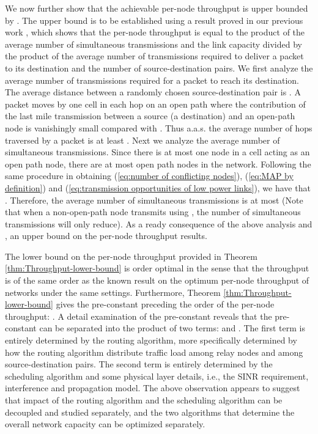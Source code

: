 \documentclass[english]{IEEEtran}
\theoremstyle{plain}
\theoremstyle{plain}
\theoremstyle{plain}
\theoremstyle{remark}
\begin{document}
\begin{IEEEproof}
We now further  show that the achievable per-node throughput is upper
bounded by .
The upper bound is to be established using a result proved in our
previous work \cite[Corollary 6]{Mao13Towards}, which shows that
the per-node throughput is equal to the product of the average number
of simultaneous transmissions and the link capacity divided by the
product of the average number of transmissions required to deliver
a packet to its destination and the number of source-destination pairs.
We first analyze the average number of transmissions required for
a packet to reach its destination. The average distance between a
randomly chosen source-destination pair is  \cite{Philip07The}.
A packet moves by one cell in each hop on an open path where the contribution
of the last mile transmission between a source (a destination) and
an open-path node is vanishingly small compared with .
Thus a.a.s. the average number of hops traversed by a packet is at
least . Next we analyze the average number
of simultaneous transmissions. Since there is at most one node in
a cell acting as an open path node, there are at most 
open path nodes in the network. Following the same procedure in obtaining
(\ref{eq:number of conflicting nodes}), (\ref{eq:MAP by definition})
and (\ref{eq:transmission opportunities of low power links}), we
have that .
Therefore, the average number of simultaneous transmissions is at
most 
(Note that when a non-open-path node transmits using , the
number of simultaneous transmissions will only reduce). As a ready
consequence of the above analysis and \cite[Corollary 6]{Mao13Towards},
an upper bound on the per-node throughput results.
\end{IEEEproof}
The lower bound on the per-node throughput provided in Theorem \ref{thm:Throughput-lower-bound}
is order optimal in the sense that the throughput is of the same order
as the known result on the optimum per-node throughput \cite{Franceschetti07Closing}
of networks under the same settings. Furthermore, Theorem \ref{thm:Throughput-lower-bound}
gives the pre-constant preceding the order of the per-node throughput:
. A detail examination of the
pre-constant reveals that the pre-constant can be separated into the
product of two terms:  and .
The first term  is entirely determined
by the routing algorithm, more specifically determined by how the
routing algorithm distribute traffic load among relay nodes and among
source-destination pairs. The second term  is entirely
determined by the scheduling algorithm and some physical layer details,
i.e., the SINR requirement, interference and propagation model. The
above observation appears to suggest that impact of the routing algorithm
and the scheduling algorithm can be decoupled and studied separately,
and the two algorithms that determine the overall network capacity
can be optimized separately.
\end{document}

